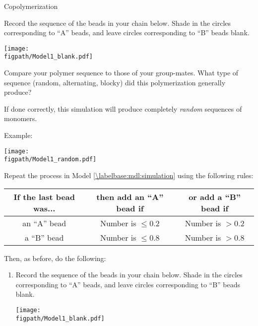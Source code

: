 \begin{activity}{Copolymerization}
\begin{model}
\end{model}


\begin{ctqs}

	\question \label{\labelbase:ctq:sim-random} Record the sequence of the beads in your chain below.  Shade in the circles corresponding to ``A'' beads, and leave circles corresponding to ``B'' beads blank.
	
		\vspace{6pt}
		\centerline{\texttt{[image: \\figpath/Model1\_blank.pdf]}}
	
	\question Compare your polymer sequence to those of your group-mates.  What type of sequence (random, alternating, blocky) did this polymerization generally produce?
		
		\begin{solution}[1in]{}
			If done correctly, this simulation will produce completely \emph{random} sequences of monomers.
			
			Example:
			
				\centerline{\texttt{[image: \\figpath/Model1\_random.pdf]}}
		\end{solution}
	
	\question \label{\labelbase:ctq:sim-alternating} Repeat the process in Model \ref{\labelbase:mdl:simulation} using the following rules:	\begin{center}
					\renewcommand{\arraystretch}{1.5}
					\begin{tabular}{|c|c|c|}
						\hline
						\textbf{If the last bead was...} &  \textbf{then add an ``A'' bead if} & \textbf{or add a ``B'' bead if}\\\hline
						 an ``A'' bead & Number is $\leq 0.2$ & Number is $> 0.2$ \\\hline
						 a ``B'' bead & Number is $\leq 0.8$ & Number is $> 0.8$ \\\hline
					\end{tabular}
					\end{center}
	
		Then, as before, do the following:
		\begin{enumerate}
			\item Record the sequence of the beads in your chain below.  Shade in the circles corresponding to ``A'' beads, and leave circles corresponding to ``B'' beads blank.
	
		\vspace{6pt}
		\centerline{\texttt{[image: \\figpath/Model1\_blank.pdf]}}
	

\end{enumerate}
\end{ctqs}
\end{activity}
